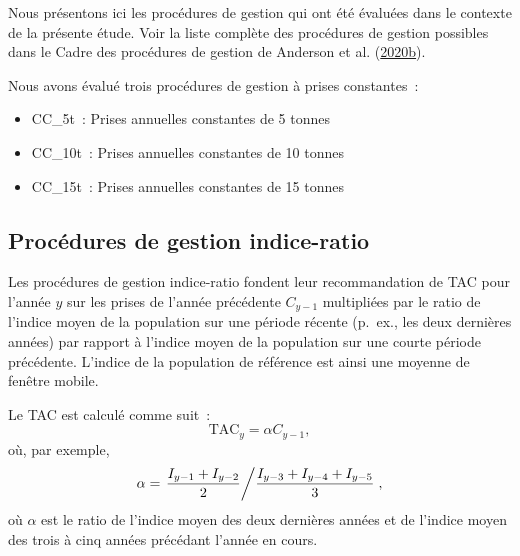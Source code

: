 \documentclass[french,11pt]{book}
\begin{document}
Nous présentons ici les procédures de gestion qui ont été évaluées dans le contexte de la présente étude. Voir la liste complète des procédures de gestion possibles dans le Cadre des procédures de gestion de Anderson et al. (\protect\hyperlink{ref-anderson2020gfmp}{2020b}).

\hypertarget{sec:mp-cc}{%
\label{sec:mp-cc}}

Nous avons évalué trois procédures de gestion à prises constantes~:
\begin{itemize}

\item
  CC\_5t~: Prises annuelles constantes de 5 tonnes
\item
  CC\_10t~: Prises annuelles constantes de 10 tonnes
\item
  CC\_15t~: Prises annuelles constantes de 15 tonnes
\end{itemize}
\hypertarget{sec:mp-ibased}{%
\label{sec:mp-ibased}}

\hypertarget{sec:mp-iratio}{%
\subsection{Procédures de gestion indice-ratio}\label{sec:mp-iratio}}

Les procédures de gestion indice-ratio fondent leur recommandation de TAC pour l'année \(y\) sur les prises de l'année précédente \(C_{y-1}\) multipliées par le ratio de l'indice moyen de la population sur une période récente (p.~ex., les deux dernières années) par rapport à l'indice moyen de la population sur une courte période précédente. L'indice de la population de référence est ainsi une moyenne de fenêtre mobile.

Le TAC est calculé comme suit~:
\begin{equation}
\textrm{TAC}_y = \alpha C_{y-1},
\end{equation}
où, par exemple,
\begin{equation}
\alpha =
\left. \frac{I_{y-1} + I_{y-2}} {2} \middle/
\frac{I_{y-3} + I_{y-4} + I_{y-5}} {3} \right. ,
\end{equation}
où \(\alpha\) est le ratio de l'indice moyen des deux dernières années et de l'indice moyen des trois à cinq années précédant l'année en cours.
\end{document}
